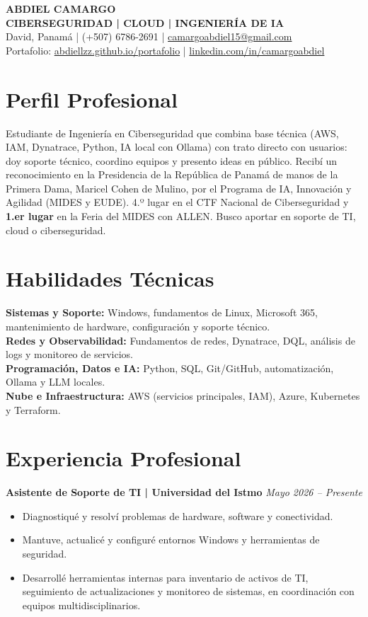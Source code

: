 \documentclass[10pt,a4paper]{article}
\begin{document}
\begin{center}
{\LARGE\bfseries ABDIEL CAMARGO}\\[2pt]
{\normalsize\bfseries CIBERSEGURIDAD \;|\; CLOUD \;|\; INGENIERÍA DE IA}\\[3pt]
{\small David, Panamá \;|\; (+507) 6786-2691 \;|\; \href{mailto:camargoabdiel15@gmail.com}{camargoabdiel15@gmail.com}}\\[1pt]
{\small Portafolio: \href{https://abdiellzz.github.io/portafolio/}{abdiellzz.github.io/portafolio} \;|\; \href{https://www.linkedin.com/in/camargoabdiel/}{linkedin.com/in/camargoabdiel}}
\end{center}

\vspace{-4pt}

\section*{Perfil Profesional}
Estudiante de Ingeniería en Ciberseguridad que combina base técnica (AWS, IAM, Dynatrace, Python, IA local con Ollama) con trato directo con usuarios: doy soporte técnico, coordino equipos y presento ideas en público. Recibí un reconocimiento en la Presidencia de la República de Panamá de manos de la Primera Dama, Maricel Cohen de Mulino, por el Programa de IA, Innovación y Agilidad (MIDES y EUDE). 4.º lugar en el CTF Nacional de Ciberseguridad y \textbf{1.er lugar} en la Feria del MIDES con ALLEN. Busco aportar en soporte de TI, cloud o ciberseguridad.

\section*{Habilidades Técnicas}
\textbf{Sistemas y Soporte:} Windows, fundamentos de Linux, Microsoft 365, mantenimiento de hardware, configuración y soporte técnico.\\
\textbf{Redes y Observabilidad:} Fundamentos de redes, Dynatrace, DQL, análisis de logs y monitoreo de servicios.\\
\textbf{Programación, Datos e IA:} Python, SQL, Git/GitHub, automatización, Ollama y LLM locales.\\
\textbf{Nube e Infraestructura:} AWS (servicios principales, IAM), Azure, Kubernetes y Terraform.

\section*{Experiencia Profesional}
\textbf{Asistente de Soporte de TI \;|\; Universidad del Istmo} \hfill \textit{Mayo 2026 -- Presente}
\begin{itemize}
  \item Diagnostiqué y resolví problemas de hardware, software y conectividad.
  \item Mantuve, actualicé y configuré entornos Windows y herramientas de seguridad.
  \item Desarrollé herramientas internas para inventario de activos de TI, seguimiento de actualizaciones y monitoreo de sistemas, en coordinación con equipos multidisciplinarios.
\end{itemize}
\end{document}
